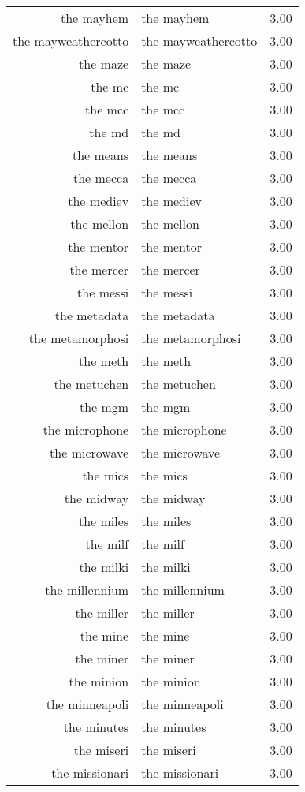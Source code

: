 \begin{table}[ht]
\begin{tabular}{rlr}
  the mayhem & the mayhem & 3.00 \\ 
  the mayweathercotto & the mayweathercotto & 3.00 \\ 
  the maze & the maze & 3.00 \\ 
  the mc & the mc & 3.00 \\ 
  the mcc & the mcc & 3.00 \\ 
  the md & the md & 3.00 \\ 
  the means & the means & 3.00 \\ 
  the mecca & the mecca & 3.00 \\ 
  the mediev & the mediev & 3.00 \\ 
  the mellon & the mellon & 3.00 \\ 
  the mentor & the mentor & 3.00 \\ 
  the mercer & the mercer & 3.00 \\ 
  the messi & the messi & 3.00 \\ 
  the metadata & the metadata & 3.00 \\ 
  the metamorphosi & the metamorphosi & 3.00 \\ 
  the meth & the meth & 3.00 \\ 
  the metuchen & the metuchen & 3.00 \\ 
  the mgm & the mgm & 3.00 \\ 
  the microphone & the microphone & 3.00 \\ 
  the microwave & the microwave & 3.00 \\ 
  the mics & the mics & 3.00 \\ 
  the midway & the midway & 3.00 \\ 
  the miles & the miles & 3.00 \\ 
  the milf & the milf & 3.00 \\ 
  the milki & the milki & 3.00 \\ 
  the millennium & the millennium & 3.00 \\ 
  the miller & the miller & 3.00 \\ 
  the mine & the mine & 3.00 \\ 
  the miner & the miner & 3.00 \\ 
  the minion & the minion & 3.00 \\ 
  the minneapoli & the minneapoli & 3.00 \\ 
  the minutes & the minutes & 3.00 \\ 
  the miseri & the miseri & 3.00 \\ 
  the missionari & the missionari & 3.00 \\ 

\end{tabular}
\end{table}

